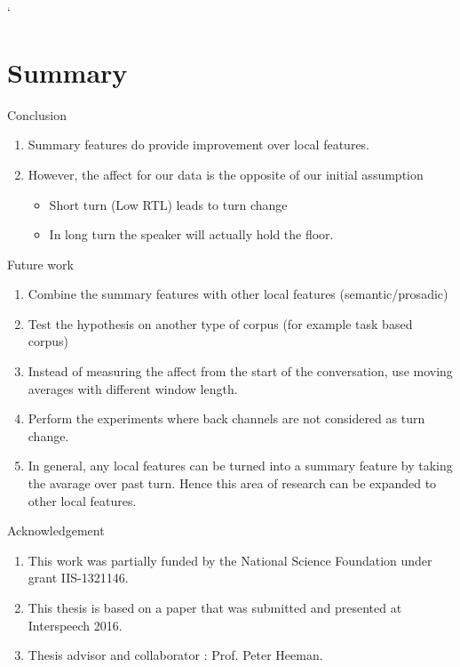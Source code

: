 `%

\section{Summary}
\frame{\sectionpage}

\begin{frame}{Conclusion}
   \begin{enumerate}[<+->]\itemsep9pt
      \item Summary features do provide improvement over local features. 
      \item However, the affect for our data is the opposite of our initial assumption
              \begin{itemize}
                \item Short turn (Low RTL) leads to turn change
                \item In long turn the speaker will actually hold the floor.
               \end{itemize}
    \end{enumerate}
\end{frame}{}

\begin{frame}{Future work}
   \begin{enumerate}[<+->]\itemsep9pt
      \item Combine the summary features with other local features (semantic/prosadic)
      \item Test the hypothesis on another type of corpus (for example task based corpus)
      \item Instead of measuring the affect from the start of the conversation, use moving averages with different window length.
      \item Perform the experiments where back channels are not considered as turn change. 
      \item In general, any local features can be turned into a summary feature by taking the avarage
            over past turn. Hence this area of research can be expanded to other local features.
      
          
    \end{enumerate}
\end{frame}{}



\begin{frame} {Acknowledgement}
 \begin{center}
       \begin{enumerate}[<+->]\itemsep9pt
           \item This work was partially funded by the National Science Foundation under grant IIS-1321146.
           \item This thesis is based on a paper that was submitted and presented at Interspeech 2016.
           \item Thesis advisor and collaborator : Prof. Peter Heeman.
       \end{enumerate}
 \end{center}
\end{frame}

